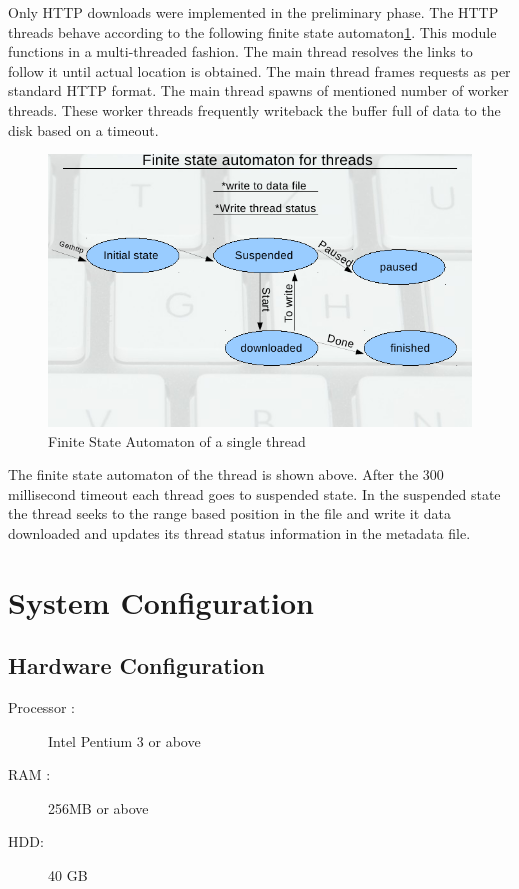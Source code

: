 \documentclass[pdftex,12pt,a4paper,pdfencoding=unicode]{article}
\begin{document}
\begin{onehalfspace}
       Only HTTP downloads were implemented in the preliminary phase. The HTTP threads behave according to the following finite state
       automaton\ref{fig:ts}. This module functions in a multi-threaded fashion. The main thread resolves the links to follow it until
       actual location is obtained. The main thread frames requests as per standard HTTP format. The main thread spawns of mentioned
       number of worker threads. These worker threads frequently writeback the buffer full of data to the disk based on a timeout.
       \newpage
       \begin{figure}[h!]
        \includegraphics[scale=0.90]{pic/ts.png}
         \caption{Finite State Automaton of a single thread \label{fig:ts}}
       \end{figure}

       The finite state automaton of the thread is shown above. After the 300 millisecond timeout each thread goes to suspended state.
       In the suspended state the thread seeks to the range based position in the file and write it data downloaded and updates its thread
       status information in the metadata file.

       \newpage
       \section{System Configuration}
       \subsection{Hardware Configuration}
       \begin{description}
         \item[Processor :] Intel Pentium 3 or above
         \item[RAM :] 256MB or above
         \item[HDD: ] 40 GB
       \end{description}


\end{onehalfspace}
\end{document}
